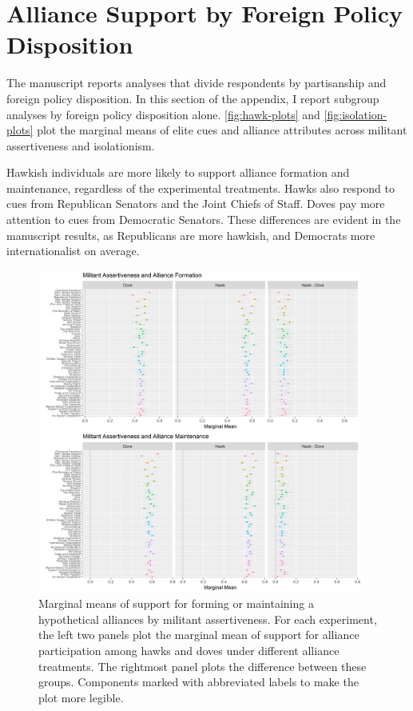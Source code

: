 \documentclass[12pt]{article}
\begin{document}
\section{Alliance Support by Foreign Policy Disposition} 


The manuscript reports analyses that divide respondents by partisanship and foreign policy disposition. 
In this section of the appendix, I report subgroup analyses by foreign policy disposition alone. 
\autoref{fig:hawk-plots} and \autoref{fig:isolation-plots} plot the marginal means of elite cues and alliance attributes across militant assertiveness and isolationism. 


Hawkish individuals are more likely to support alliance formation and maintenance, regardless of the experimental treatments. 
Hawks also respond to cues from Republican Senators and the Joint Chiefs of Staff. 
Doves pay more attention to cues from Democratic Senators.
These differences are evident in the manuscript results, as Republicans are more hawkish, and Democrats more internationalist on average. 


\begin{figure}
	\centering
		\includegraphics[width=0.95\textwidth]{hawk-plots.png}
	\caption{Marginal means of support for forming or maintaining a hypothetical alliances by militant assertiveness. For each experiment, the left two panels plot the marginal mean of support for alliance participation among hawks and doves under different alliance treatments. The rightmost panel plots the difference between these groups. Components marked with abbreviated labels to make the plot more legible.}
	\label{fig:hawk-plots}
\end{figure}
\end{document}

